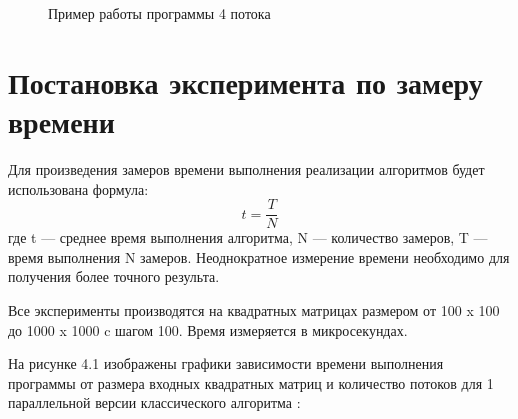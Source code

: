 \documentclass[12pt]{report}
\begin{document}
\begin{figure}[h]
	\caption{Пример работы программы 4 потока}
	\label{figure:image}
\end{figure}

\newpage
\section{Постановка эксперимента по замеру времени}

Для произведения замеров времени выполнения реализации алгоритмов будет использована формула: \begin{equation}\label{eq:fourierrow}
	t = \frac{T}{N}
\end{equation}
где t — среднее время выполнения алгоритма, N — количество замеров, T — время выполнения N замеров.  
Неоднократное измерение времени необходимо для получения более точного результа.  
 
 \qquad Все эксперименты производятся на квадратных матрицах размером от 100 x 100 до 1000 x 1000 c шагом 100. Время измеряется в микросекундах.
 
 На рисунке 4.1 изображены графики зависимости времени выполнения программы от размера входных квадратных матриц и количество потоков для 1 параллельной версии классического алгоритма :  
 
\end{document}
